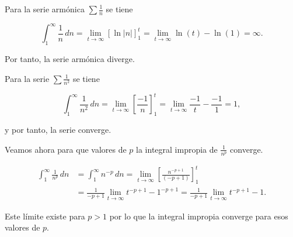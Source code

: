 \documentclass[
  spanish,
  a4paper,
]{scrreport}
\theoremstyle{definition}
\theoremstyle{remark}
\begin{document}
\begin{tcolorbox}[enhanced jigsaw, arc=.35mm, bottomrule=.15mm, bottomtitle=1mm, breakable, colback=white, colbacktitle=quarto-callout-tip-color!10!white, colframe=quarto-callout-tip-color-frame, coltitle=black, left=2mm, leftrule=.75mm, opacityback=0, opacitybacktitle=0.6, rightrule=.15mm, title=\textcolor{quarto-callout-tip-color}{\faLightbulb}\hspace{0.5em}{Solución}, titlerule=0mm, toprule=.15mm, toptitle=1mm]

Para la serie armónica \(\sum \frac{1}{n}\) se tiene

\[
\int_1^\infty \frac{1}{n}\,dn = \lim_{t\to\infty}\left[\ln|n|\right]_1^t = \lim_{t\to\infty}\ln(t) - \ln(1)= \infty.
\]

Por tanto, la serie armónica diverge.

Para la serie \(\sum \frac{1}{n^2}\) se tiene

\[
\int_1^\infty \frac{1}{n^2}\,dn = \lim_{t\to\infty} \left[\frac{-1}{n}\right]_1^t = \lim_{t\to\infty}\frac{-1}{t}-\frac{-1}{1}= 1,
\]

y por tanto, la serie converge.

Veamos ahora para que valores de \(p\) la integral impropia de
\(\frac{1}{n^p}\) converge.

\begin{align*}
\int_1^\infty \frac{1}{n^p}\,dn 
&= \int_1^\infty n^{-p}\,dn 
= \lim_{t\to\infty} \left[\frac{n^{-p+1}}{(-p+1)}\right]_1^t \\
&= \frac{1}{-p+1}\lim_{t\to\infty}t^{-p+1}-1^{-p+1}
= \frac{1}{-p+1}\lim_{t\to\infty}t^{-p+1}-1.
\end{align*}

Este límite existe para \(p>1\) por lo que la integral impropia converge
para esos valores de \(p\).

\end{tcolorbox}
\end{document}

